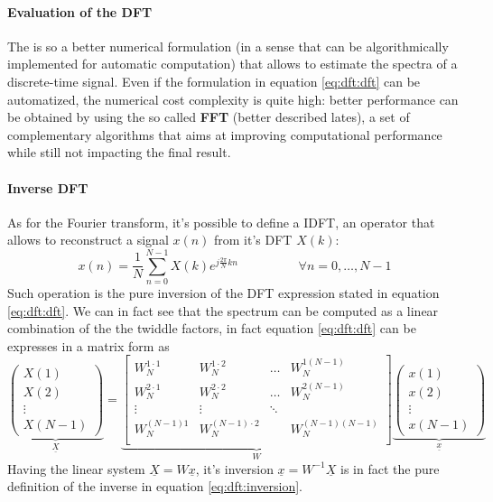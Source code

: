 	\paragraph{Evaluation of the DFT} The \dft is so a better numerical formulation (in a sense that can be algorithmically implemented for automatic computation) that allows to estimate the spectra of a discrete-time signal. Even if the formulation in equation \ref{eq:dft:dft} can be automatized, the numerical cost complexity is quite high: better performance can be obtained by using the so called  \textbf{FFT} (better described lates), a set of complementary algorithms that aims at improving computational performance while still not impacting the final result.
	
	\paragraph{Inverse DFT} As for the Fourier transform, it's possible to define a 	 IDFT, an operator that allows to reconstruct a signal $x(n)$ from it's DFT $X(k)$:
	\begin{equation} \label{eq:dft:inversion}
		x(n) = \frac 1 N \sum_{n=0}^{N-1} X(k) e^{j\frac{2\pi}{N} kn } \hspace{2cm} \forall n = 0,\dots, N-1
	\end{equation}
	Such operation is the pure inversion of the DFT expression stated in equation \ref{eq:dft:dft}. We can in fact see that the spectrum can be computed as a linear combination of the the twiddle factors, in fact equation \ref{eq:dft:dft} can be expresses in a matrix form as
	\[ \underbrace{\begin{pmatrix}
		X(1) \\ X(2) \\ \vdots \\ X(N-1)
	\end{pmatrix}}_{\underline X} =  \underbrace{\begin{bmatrix}
		W_N^{1\cdot 1} & W_N^{1\cdot 2} & \dots & W_N^{1(N-1)} \\
		W_N^{2\cdot 1} & W_N^{2\cdot 2} & \dots & W_N^{2(N-1)} \\
		\vdots & \vdots & \ddots \\		
		W_N^{(N-1) 1} & W_N^{(N-1)\cdot 2} &  & W_N^{(N-1)(N-1)} \\
	\end{bmatrix}}_W \underbrace{\begin{pmatrix}
		x(1) \\ x(2) \\ \vdots \\ x(N-1)
	\end{pmatrix}}_{\underline x} \]
	Having the linear system $\underline X = W \underline x$, it's inversion $\underline x = W^{-1} \underline X$ is in fact the pure definition of the inverse \dft in equation \ref{eq:dft:inversion}.
	

